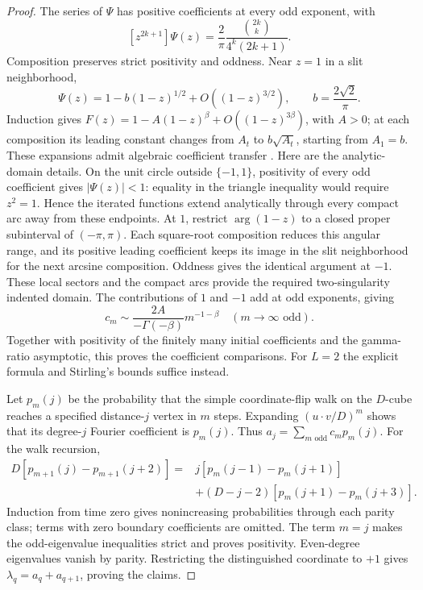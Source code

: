 \begin{proof}
The series of $\Psi$ has positive coefficients at every odd exponent,
with
\[
 [z^{2k+1}]\Psi(z)=\frac2\pi\frac{\binom{2k}{k}}{4^k(2k+1)}.
\]
Composition preserves strict positivity and oddness. Near $z=1$ in
a slit neighborhood,
\[
 \Psi(z)=1-b(1-z)^{1/2}+O((1-z)^{3/2}),
 \qquad b=\frac{2\sqrt2}{\pi}.
\]
Induction gives
$F(z)=1-A(1-z)^\beta+O((1-z)^{3\beta})$, with $A>0$;
at each composition its leading constant changes from $A_t$ to
$b\sqrt{A_t}$, starting from $A_1=b$.
These expansions admit algebraic coefficient transfer
\cite[Chapter VI]{flajolet2009}. Here are the analytic-domain details.
On the unit circle outside $\{-1,1\}$, positivity of every odd
coefficient gives $|\Psi(z)|<1$: equality in the triangle inequality
would require $z^2=1$. Hence the iterated functions extend
analytically through every compact arc away from these endpoints.
At $1$, restrict $\arg(1-z)$ to a closed proper subinterval of
$(-\pi,\pi)$. Each square-root composition reduces this angular
range, and its positive leading coefficient keeps its image in the
slit neighborhood for the next arcsine composition. Oddness gives
the identical argument at $-1$. These local sectors and the compact
arcs provide the required two-singularity indented domain.
The contributions of $1$ and $-1$ add at odd exponents, giving
\[
 c_m\sim\frac{2A}{-\Gamma(-\beta)}m^{-1-\beta}
 \quad(m\to\infty\text{ odd}).
\]
Together with positivity of the finitely many initial coefficients
and the gamma-ratio asymptotic, this proves the coefficient comparisons.
For $L=2$ the explicit formula and Stirling's bounds suffice instead.

Let $p_m(j)$ be the probability that the simple coordinate-flip walk
on the $D$-cube reaches a specified distance-$j$ vertex in $m$ steps.
Expanding $(u\cdot v/D)^m$ shows that its degree-$j$ Fourier coefficient
is $p_m(j)$. Thus $a_j=\sum_{m\text{ odd}}c_mp_m(j)$.
For the walk recursion,
\begin{align*}
 D[p_{m+1}(j)-p_{m+1}(j+2)]
 ={}&j[p_m(j-1)-p_m(j+1)]\\
 &+(D-j-2)[p_m(j+1)-p_m(j+3)].
\end{align*}
Induction from time zero gives nonincreasing probabilities through
each parity class; terms with zero boundary coefficients are omitted.
The term $m=j$ makes the odd-eigenvalue inequalities strict and proves
positivity. Even-degree eigenvalues vanish by parity.
Restricting the distinguished coordinate to $+1$ gives
$\lambda_q=a_q+a_{q+1}$, proving the claims.
\end{proof}

